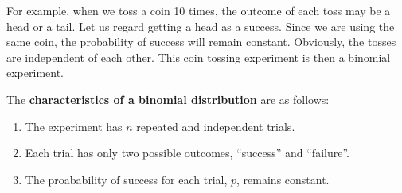 \documentclass[11pt,a4paper]{book}
\begin{document}
For example, when we toss a coin 10 times, the outcome of each toss may be a head or a tail. Let us regard getting a head as a success. Since we are using the same coin, the probability of success will remain constant. Obviously, the tosses are independent of each other. This coin tossing experiment is then a binomial experiment.

\begin{tcolorbox}[colback=blue!5, colframe=black, boxrule=.4pt, sharpish corners]

The \textbf{characteristics of a binomial distribution} are as follows:

\begin{enumerate}[leftmargin=2cm]

\item  The experiment has $n$ repeated and independent trials.

\item  Each trial has only two possible outcomes, ``success'' and
``failure''.

\item  The proabability of success for each trial, $p$, remains
constant.

\end{enumerate}
\end{tcolorbox}
\end{document}
